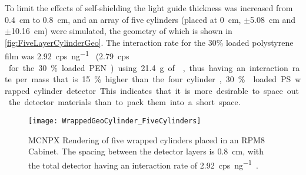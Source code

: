 To limit the effects of self-shielding the light guide thickness was increased from \SI{0.4}{\cm} to \SI{0.8}{\cm}, and an array of five cylinders (placed at \SI{0}{\cm}, $\pm$\SI{5.08}{\cm} and $\pm$\SI{10.16}{\cm}) were simulated, the geometry of which is shown in \autoref{fig:FiveLayerCylinderGeo}.
The interaction rate for the 30\% loaded polystyrene film was \SI{2.92}{cps\per\ng  {}} (\SI{2.79}{cps\per\ng {} } for the 30\% loaded PEN) using \SI{21.4}{\gram} of , thus having an interaction rate per mass that is 15\% higher than the four cylinder, 30\%  loaded PS wrapped cylinder detector.
This indicates that it is more desirable to space out the detector materials than to pack them into a short space.
\begin{figure}
  \centering
  \texttt{[image: WrappedGeoCylinder\_FiveCylinders]}
  \caption[Rendering of Five Layered Cylinders in RPM Cabinet]{MCNPX Rendering of five wrapped cylinders placed in an RPM8 Cabinet. The spacing between the detector layers is \SI{0.8}{\cm}, with the total detector having an interaction rate of  \SI{2.92}{cps\per\ng  {}}.}
  \label{fig:FiveLayerCylinderGeo}
\end{figure}

